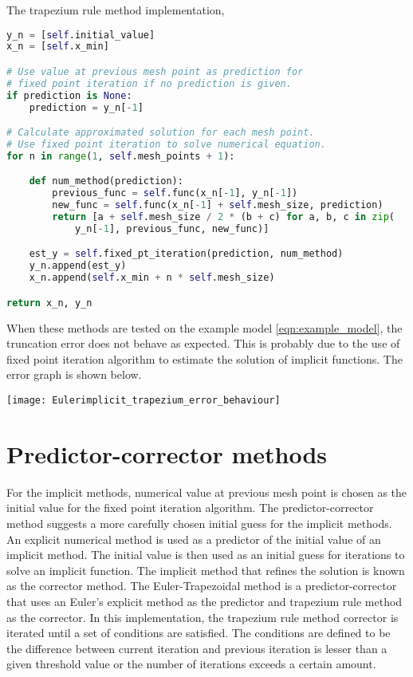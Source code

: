 The trapezium rule method implementation,
\begin{lstlisting}[language=Python]
y_n = [self.initial_value]
x_n = [self.x_min]

# Use value at previous mesh point as prediction for
# fixed point iteration if no prediction is given.
if prediction is None:
    prediction = y_n[-1]

# Calculate approximated solution for each mesh point.
# Use fixed point iteration to solve numerical equation.
for n in range(1, self.mesh_points + 1):

    def num_method(prediction):
        previous_func = self.func(x_n[-1], y_n[-1])
        new_func = self.func(x_n[-1] + self.mesh_size, prediction)
        return [a + self.mesh_size / 2 * (b + c) for a, b, c in zip(
            y_n[-1], previous_func, new_func)]

    est_y = self.fixed_pt_iteration(prediction, num_method)
    y_n.append(est_y)
    x_n.append(self.x_min + n * self.mesh_size)

return x_n, y_n
\end{lstlisting}

When these methods are tested on the example model \ref{eqn:example_model}, the truncation error does not behave as expected. This is probably due to the use of fixed point iteration algorithm to estimate the solution of implicit functions. The error graph is shown below.

\texttt{[image: Eulerimplicit\_trapezium\_error\_behaviour]}

\section{Predictor-corrector methods}
For the implicit methods, numerical value at previous mesh point is chosen as the initial value for the fixed point iteration algorithm. The predictor-corrector method suggests a more carefully chosen initial guess for the implicit methods. An explicit numerical method is used as a predictor of the initial value of an implicit method. The initial value is then used as an initial guess for iterations to solve an implicit function. The implicit method that refines the solution is known as the corrector method. The Euler-Trapezoidal method is a predictor-corrector that uses an Euler's explicit method as the predictor and trapezium rule method as the corrector. In this implementation, the trapezium rule method corrector is iterated until a set of conditions are satisfied. The conditions are defined to be the difference between current iteration and previous iteration is lesser than a given threshold value or the number of iterations exceeds a certain amount.  